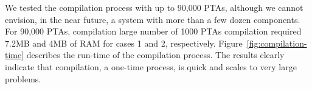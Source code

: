 \documentclass[letterpaper]{article}
\newcommand{\frameImage}[4]{
\begin{figure}[H] 
  \centerline{
    \fcolorbox{frameColor}{white}{
        \texttt{[image: \#1]} } }
    \caption{#4}
    \label{fig:#1}
\end{figure}
}
\begin{document}
We tested the compilation process with up to 90,000 PTAs, although  we cannot envision, in the near future, a system with more than a few dozen components. For 90,000 PTAs, compilation %
large number of 1000 PTAs
compilation 
required  7.2MB and 4MB of RAM for cases 1 and 2, respectively. 
Figure~\ref{fig:compilation-time} 
describes the run-time %
of the compilation process.
%
The results clearly indicate that compilation, a one-time process, is quick and scales to very large problems. 



\end{document}
